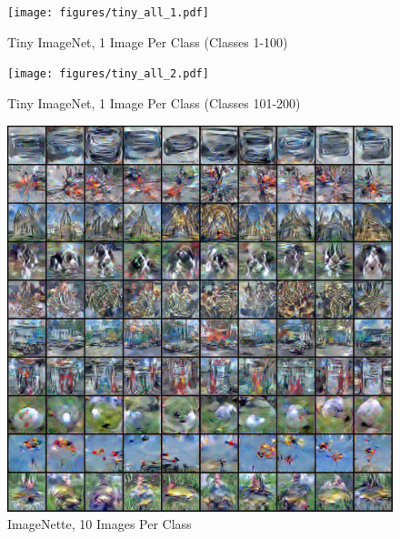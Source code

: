 \begin{figure}
    \centering
    \texttt{[image: figures/tiny\_all\_1.pdf]}
    \caption{Tiny ImageNet, 1 Image Per Class (Classes 1-100)}
    \label{fig:tiny1}
\end{figure}

\begin{figure}
    \centering
    \texttt{[image: figures/tiny\_all\_2.pdf]}
    \caption{Tiny ImageNet, 1 Image Per Class (Classes 101-200)}
    \label{fig:tiny2}
\end{figure}

\begin{figure}
    \centering
    \includegraphics[width=\linewidth]{figures/imagenet_10/imagenette_all.pdf}
    \caption{ImageNette, 10 Images Per Class}
    \label{fig:nette_10}
\end{figure}
